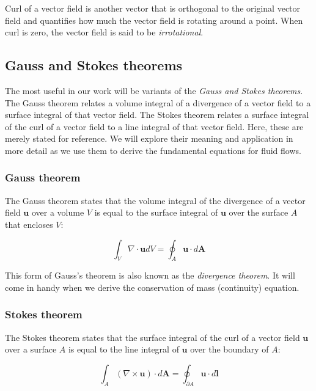 \documentclass[12pt]{article}
\numberwithin{equation}{section}
\numberwithin{figure}{section}
\numberwithin{table}{section}
\begin{document}
Curl of a vector field is another vector that is orthogonal to the original
vector field and quantifies how much the vector field is rotating around a
point.
When curl is zero, the vector field is said to be \textit{irrotational}.

\subsection{Gauss and Stokes theorems}

The most useful in our work will be variants of the
\textit{Gauss and Stokes theorems}.
The Gauss theorem relates a volume integral of a divergence of a vector field
to a surface integral of that vector field.
The Stokes theorem relates a surface integral of the curl of a vector field to
a line integral of that vector field.
Here, these are merely stated for reference.
We will explore their meaning and application in more detail as we use them
to derive the fundamental equations for fluid flows.

\subsubsection{Gauss theorem}

The Gauss theorem states that the volume integral of the
divergence of a vector field $\mathbf{u}$ over a volume $V$ is equal to the
surface integral of $\mathbf{u}$ over the surface $A$ that encloses $V$:

\begin{equation}
  \label{eq:divergence_theorem}
  \int_V \nabla \cdot \mathbf{u} dV = \oint_A \mathbf{u} \cdot d\mathbf{A}
\end{equation}

This form of Gauss's theorem is also known as the
\textit{divergence theorem}.
It will come in handy when we derive the conservation of mass (continuity)
equation.

\subsubsection{Stokes theorem}

The Stokes theorem states that the surface integral of the curl of a
vector field $\mathbf{u}$ over a surface $A$ is equal to the line integral of
$\mathbf{u}$ over the boundary of $A$:

\begin{equation}
  \int_A (\nabla \times \mathbf{u}) \cdot d\mathbf{A} = \oint_{\partial A} \mathbf{u} \cdot d\mathbf{l}
\end{equation}
\end{document}
